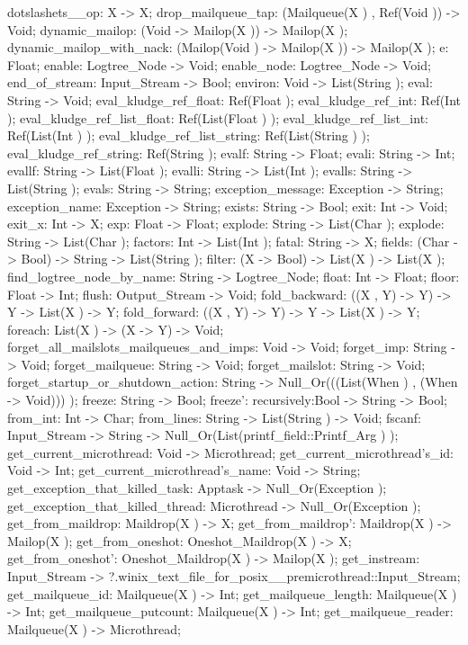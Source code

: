 dotslashets__op: X -> X;
drop_mailqueue_tap: (Mailqueue(X ) , Ref(Void )) -> Void;
dynamic_mailop: (Void -> Mailop(X )) -> Mailop(X );
dynamic_mailop_with_nack: (Mailop(Void ) -> Mailop(X )) -> Mailop(X );
e: Float;
enable: Logtree_Node -> Void;
enable_node: Logtree_Node -> Void;
end_of_stream: Input_Stream -> Bool;
environ: Void -> List(String );
eval: String -> Void;
eval_kludge_ref_float: Ref(Float );
eval_kludge_ref_int: Ref(Int );
eval_kludge_ref_list_float: Ref(List(Float ) );
eval_kludge_ref_list_int: Ref(List(Int ) );
eval_kludge_ref_list_string: Ref(List(String ) );
eval_kludge_ref_string: Ref(String );
evalf: String -> Float;
evali: String -> Int;
evallf: String -> List(Float );
evalli: String -> List(Int );
evalls: String -> List(String );
evals: String -> String;
exception_message: Exception -> String;
exception_name: Exception -> String;
exists: String -> Bool;
exit: Int -> Void;
exit_x: Int -> X;
exp: Float -> Float;
explode: String -> List(Char );
explode: String -> List(Char );
factors: Int -> List(Int );
fatal: String -> X;
fields: (Char -> Bool) -> String -> List(String );
filter: (X -> Bool) -> List(X ) -> List(X );
find_logtree_node_by_name: String -> Logtree_Node;
float: Int -> Float;
floor: Float -> Int;
flush: Output_Stream -> Void;
fold_backward: ((X , Y) -> Y) -> Y -> List(X ) -> Y;
fold_forward: ((X , Y) -> Y) -> Y -> List(X ) -> Y;
foreach: List(X ) -> (X -> Y) -> Void;
forget_all_mailslots_mailqueues_and_imps: Void -> Void;
forget_imp: String -> Void;
forget_mailqueue: String -> Void;
forget_mailslot: String -> Void;
forget_startup_or_shutdown_action: String -> Null_Or(((List(When ) , (When -> Void))) );
freeze: String -> Bool;
freeze': {recursively:Bool} -> String -> Bool;
from_int: Int -> Char;
from_lines: String -> List(String ) -> Void;
fscanf: Input_Stream -> String -> Null_Or(List(printf_field::Printf_Arg ) );
get_current_microthread: Void -> Microthread;
get_current_microthread's_id: Void -> Int;
get_current_microthread's_name: Void -> String;
get_exception_that_killed_task: Apptask -> Null_Or(Exception );
get_exception_that_killed_thread: Microthread -> Null_Or(Exception );
get_from_maildrop: Maildrop(X ) -> X;
get_from_maildrop': Maildrop(X ) -> Mailop(X );
get_from_oneshot: Oneshot_Maildrop(X ) -> X;
get_from_oneshot': Oneshot_Maildrop(X ) -> Mailop(X );
get_instream: Input_Stream -> ?.winix_text_file_for_posix__premicrothread::Input_Stream;
get_mailqueue_id: Mailqueue(X ) -> Int;
get_mailqueue_length: Mailqueue(X ) -> Int;
get_mailqueue_putcount: Mailqueue(X ) -> Int;
get_mailqueue_reader: Mailqueue(X ) -> Microthread;
